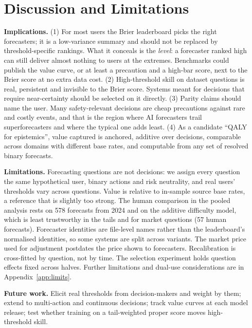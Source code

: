 \documentclass[10pt]{article}
\begin{document}
\section{Discussion and Limitations}
\textbf{Implications.} (1) For most users the Brier leaderboard picks the right forecasters; it is a low-variance summary and should not be replaced by threshold-specific rankings. What it conceals is the \emph{level}: a forecaster ranked high can still deliver almost nothing to users at the extremes. Benchmarks could publish the value curve, or at least a precaution and a high-bar score, next to the Brier score at no extra data cost. (2) High-threshold skill on dataset questions is real, persistent and invisible to the Brier score. Systems meant for decisions that require near-certainty should be selected on it directly. (3) Parity claims should name the user. Many safety-relevant decisions are cheap precautions against rare and costly events, and that is the region where AI forecasters trail superforecasters and where the typical one adds least. (4) As a candidate ``QALY for epistemics'', value captured is anchored, additive over decisions, comparable across domains with different base rates, and computable from any set of resolved binary forecasts.

\textbf{Limitations.} Forecasting questions are not decisions: we assign every question the same hypothetical user, binary actions and risk neutrality, and real users' thresholds vary across questions. Value is relative to in-sample source base rates, a reference that is slightly too strong. The human comparison in the pooled analysis rests on 578 forecasts from 2024 and on the additive difficulty model, which is least trustworthy in the tails and for market questions (57 human forecasts). Forecaster identities are file-level names rather than the leaderboard's normalised identities, so some systems are split across variants. The market price used for adjustment postdates the price shown to forecasters. Recalibration is cross-fitted by question, not by time. The selection experiment holds question effects fixed across halves. Further limitations and dual-use considerations are in Appendix~\ref{app:limits}.

\textbf{Future work.} Elicit real thresholds from decision-makers and weight by them; extend to multi-action and continuous decisions; track value curves at each model release; test whether training on a tail-weighted proper score moves high-threshold skill.
\end{document}
